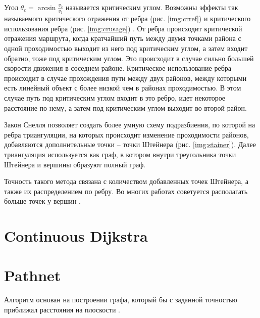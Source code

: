 
Угол $\theta_c = \arcsin\frac{v_2}{v_1}$ называется критическим углом.
Возможны эффекты так называемого критического отражения от ребра
(рис. \ref{img:crref}) и критического использования ребра
(рис. \ref{img:crusage}) \cite{SNELL}. От ребра происходит критической
отражения маршрута, когда кратчайший путь между двумя точками района
с одной проходимостью выходит из него под критическим углом, а затем
входит обратно, тоже под критическим углом. Это происходит в случае
сильно большей скорости движения в соседнем районе. Критическое
использование ребра происходит в случае прохождения пути между двух районов,
между которыми есть линейный объект с более низкой чем в районах проходимостью.
В этом случае путь под критическим углом входит в это ребро, идет некоторое
расстояние по нему, а затем под критическим углом выходит во второй район.


Закон Снелля позволяет создать более умную схему подразбиения, по которой
на ребра триангуляции, на которых происходит изменение проходимости районов,
добавляются дополнительные точки -- точки Штейнера (рис. \ref{img:stainer}).
Далее триангуляция используется как граф, в котором внутри треугольника точки
Штейнера и вершины образуют полный граф.


Точность такого метода связана с количеством добавленных точек Штейнера, а
также их распределением по ребру. Во многих работах советуется располагать
больше точек у вершин \cite{STAINER1, STAINER2}.

\FloatBarrier

\section{Continuous Dijkstra}

\FloatBarrier

\section{Pathnet}

Алгоритм основан на построении графа, который бы с заданной точностью приближал
расстояния на плоскости \cite{PATHNET}.

